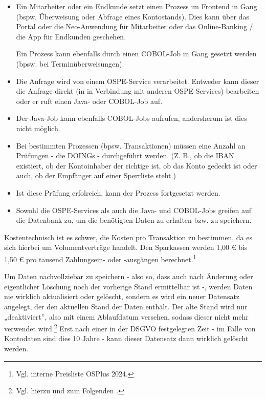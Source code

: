 \begin{itemize}
    \item Ein Mitarbeiter oder ein Endkunde setzt einen Prozess im Frontend in Gang (bspw. Überweisung oder Abfrage eines Kontostands).
    Dies kann über das Portal oder die Neo-Anwendung für Mitarbeiter oder das Online-Banking / die App für Endkunden geschehen.

    Ein Prozess kann ebenfalls durch einen COBOL-Job in Gang gesetzt werden (bpsw. bei Terminüberweisungen).
    \item Die Anfrage wird von einem OSPE-Service verarbeitet.
    Entweder kann dieser die Anfrage direkt (in in Verbindung mit anderen OSPE-Services) bearbeiten oder er ruft einen Java- oder COBOL-Job auf.
    \item Der Java-Job kann ebenfalls COBOL-Jobs aufrufen, andersherum ist dies nicht möglich.
    \item Bei bestimmten Prozessen (bpsw. Transaktionen) müssen eine Anzahl an Prüfungen - die DOINGs - durchgeführt werden. 
    (Z. B., ob die IBAN existiert, ob der Kontoinhaber der richtige ist, ob das Konto gedeckt ist oder auch, ob der Empfänger auf einer Sperrliste steht.) 
    \item Ist diese Prüfung erfolreich, kann der Prozess fortgesetzt werden.
    \item Sowohl die OSPE-Services als auch die Java- und COBOL-Jobs greifen auf die Datenbank zu, um die benötigten Daten zu erhalten bzw. zu speichern. 
\end{itemize}

Kostentechnisch ist es schwer, die Kosten pro Transaktion zu bestimmen, da es sich hierbei um Volumentverträge handelt.
Den Sparkassen werden 1,00 € bis 1,50 € pro tausend Zahlungsein- oder -ausgängen berechnet.\footnote{Vgl. interne Preisliste OSPlus 2024.}

\bigbreak
\bigbreak

\noindent
Um Daten nachvollziebar zu speichern - also so, dass auch nach Änderung oder eigentlicher Löschung noch der vorherige Stand ermittelbar ist -, werden Daten nie wirklich aktualisiert oder gelöscht, sondern es wird ein neuer Datensatz angelegt, der den aktuellen Stand der Daten enthält.
Der alte Stand wird nur „deaktiviert”, also mit einem Ablaufdatum versehen, sodass dieser nicht mehr verwendet wird.\footnote{Vgl. hierzu und zum Folgenden \pageref{i1:f2}.}
Erst nach einer in der DSGVO festgelegten Zeit - im Falle von Kontodaten sind dies 10 Jahre - kann dieser Datensatz dann wirklich gelöscht werden.



